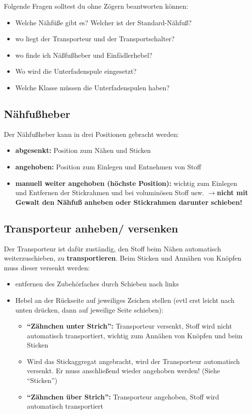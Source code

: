 \documentclass{\basedir/fablab-document}
\newcommand{\pfeil}{\ensuremath{\rightarrow}}
\begin{document}
\vspace{2em}

Folgende Fragen solltest du ohne Zögern beantworten können:
\begin{itemize}
 \item Welche Nähfüße gibt es? Welcher ist der Standard-Nähfuß?
 \item wo liegt der Transporteur und der Transportschalter?
 \item wo finde ich Näßfußheber und Einfädlerhebel?
 \item Wo wird die Unterfadenspule eingesetzt?
 \item Welche Klasse müssen die Unterfadenspulen haben?
\end{itemize}


\subsection{Nähfußheber}
Der Nähfußheber kann in drei Positionen gebracht werden:
\begin{itemize}
 \item \textbf{abgesenkt:} Position zum Nähen und Sticken
 \item \textbf{angehoben:} Position zum Einlegen und Entnehmen von Stoff 
 \item \textbf{manuell weiter angehoben (höchste Position):} wichtig zum Einlegen und Entfernen der Stickrahmen und bei voluminösen Stoff usw. \pfeil \textbf{nicht mit Gewalt den Nähfuß anheben oder Stickrahmen darunter schieben!}
\end{itemize}

\subsection{Transporteur anheben/ versenken}
Der Transporteur ist dafür zuständig, den Stoff beim Nähen automatisch weiterzuschieben, zu \textbf{transportieren}. 
\newline Beim Sticken und Annähen von Knöpfen muss dieser versenkt werden:
\begin{itemize}
 \item entfernen des Zubehörfaches durch Schieben nach links
 \item Hebel an der Rückseite auf jeweiliges Zeichen stellen (evtl erst leicht nach unten drücken, dann auf jeweilige Seite schieben):
	\begin{itemize}
 	 \item \textbf{“Zähnchen unter Strich”:} Transporteur versenkt, Stoff wird nicht automatisch
transportiert, wichtig zum Annähen von Knöpfen und beim Sticken
 	 \item Wird das Stickaggregat angebracht, wird der Transporteur automatisch versenkt. Er muss anschließend wieder angehoben werden! (Siehe “Sticken”)
 	 \item \textbf{“Zähnchen über Strich”:} Transporteur angehoben, Stoff wird automatisch transportiert 
	\end{itemize}
\end{itemize}
\end{document}

